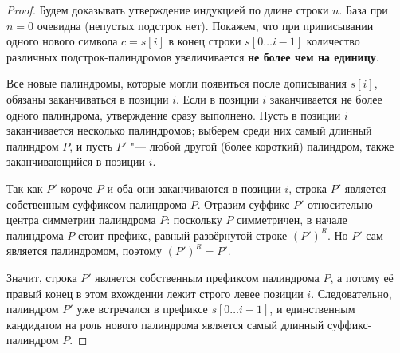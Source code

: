 \begin{proof}
    Будем доказывать утверждение индукцией по длине строки $n$. База при $n = 0$ очевидна (непустых подстрок нет). Покажем, что при приписывании одного нового символа $c = s[i]$ в конец строки $s[0 \dots i-1]$ количество различных подстрок-палиндромов увеличивается \textbf{не более чем на единицу}.

    Все новые палиндромы, которые могли появиться после дописывания $s[i]$, обязаны заканчиваться в позиции $i$. Если в позиции $i$ заканчивается не более одного палиндрома, утверждение сразу выполнено. Пусть в позиции $i$ заканчивается несколько палиндромов; выберем среди них самый длинный палиндром $P$, и пусть $P'$ "--- любой другой (более короткий) палиндром, также заканчивающийся в позиции $i$.

    \begin{center}
    \end{center}

    Так как $P'$ короче $P$ и оба они заканчиваются в позиции $i$, строка $P'$ является собственным суффиксом палиндрома $P$. Отразим суффикс $P'$ относительно центра симметрии палиндрома $P$: поскольку $P$ симметричен, в начале палиндрома $P$ стоит префикс, равный развёрнутой строке $(P')^R$. Но $P'$ сам является палиндромом, поэтому $(P')^R = P'$.

    Значит, строка $P'$ является собственным префиксом палиндрома $P$, а потому её правый конец в этом вхождении лежит строго левее позиции $i$. Следовательно, палиндром $P'$ уже встречался в префиксе $s[0 \dots i-1]$, и единственным кандидатом на роль нового палиндрома является самый длинный суффикс-палиндром $P$.
\end{proof}

